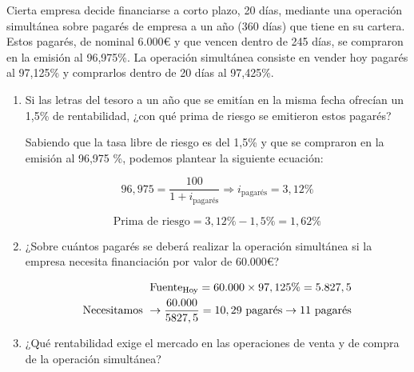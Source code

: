 Cierta empresa decide financiarse a corto plazo, 20 días, mediante una operación simultánea sobre pagarés de empresa a un año (360 días) que tiene en su cartera. Estos pagarés, de nominal 6.000€ y que vencen dentro de 245 días, se compraron en la emisión al 96,975\%. La operación simultánea consiste en vender hoy pagarés al 97,125\% y comprarlos dentro de 20 días al 97,425\%.

\begin{enumerate}[label=\textbf{\alph*)}]
    \item Si las letras del tesoro a un año que se emitían en la misma fecha ofrecían un 1,5\% de rentabilidad, ¿con qué prima de riesgo se emitieron estos pagarés?
    
    Sabiendo que la tasa libre de riesgo es del 1,5\% y que se compraron en la emisión al 96,975 \%, podemos plantear la siguiente ecuación:


    \begin{equation*}
        96,975 = \frac{100}{1 + i_{\text{pagarés}}} \Rightarrow i_{\text{pagarés}} = 3,12\%
    \end{equation*}

    \[\text{Prima de riesgo} = 3,12\% - 1,5\% = 1,62\%\]


    \item ¿Sobre cuántos pagarés se deberá realizar la operación simultánea si la empresa necesita financiación por valor de 60.000€?
    
    \begin{align*}
        \text{Fuente}_{\text{Hoy}} = 60\text{.}000 \times 97,125\% = 5\text{.}827,5 \\
        \text{Necesitamos } \rightarrow \frac{60\text{.}000}{5827,5} = 10,29 \text{ pagarés} \rightarrow 11 \text{ pagarés}
    \end{align*}

    \item ¿Qué rentabilidad exige el mercado en las operaciones de venta y de compra de la operación simultánea?
    

\end{enumerate}
